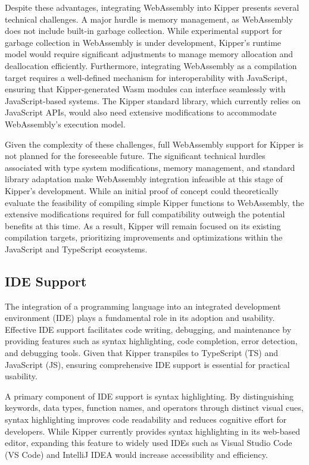 Despite these advantages, integrating WebAssembly into Kipper presents several technical challenges. A major hurdle is memory management, as WebAssembly does not include built-in garbage collection. While experimental support for garbage collection in WebAssembly is under development, Kipper’s runtime model would require significant adjustments to manage memory allocation and deallocation efficiently. Furthermore, integrating WebAssembly as a compilation target requires a well-defined mechanism for interoperability with JavaScript, ensuring that Kipper-generated Wasm modules can interface seamlessly with JavaScript-based systems. The Kipper standard library, which currently relies on JavaScript APIs, would also need extensive modifications to accommodate WebAssembly’s execution model.

Given the complexity of these challenges, full WebAssembly support for Kipper is not planned for the foreseeable future. The significant technical hurdles associated with type system modifications, memory management, and standard library adaptation make WebAssembly integration infeasible at this stage of Kipper's development. While an initial proof of concept could theoretically evaluate the feasibility of compiling simple Kipper functions to WebAssembly, the extensive modifications required for full compatibility outweigh the potential benefits at this time. As a result, Kipper will remain focused on its existing compilation targets, prioritizing improvements and optimizations within the JavaScript and TypeScript ecosystems.

\subsection{IDE Support}

The integration of a programming language into an integrated development environment (IDE) plays a fundamental role in its adoption and usability. Effective IDE support facilitates code writing, debugging, and maintenance by providing features such as syntax highlighting, code completion, error detection, and debugging tools. Given that Kipper transpiles to TypeScript (TS) and JavaScript (JS), ensuring comprehensive IDE support is essential for practical usability.

A primary component of IDE support is syntax highlighting. By distinguishing keywords, data types, function names, and operators through distinct visual cues, syntax highlighting improves code readability and reduces cognitive effort for developers. While Kipper currently provides syntax highlighting in its web-based editor, expanding this feature to widely used IDEs such as Visual Studio Code (VS Code) and IntelliJ IDEA would increase accessibility and efficiency.

